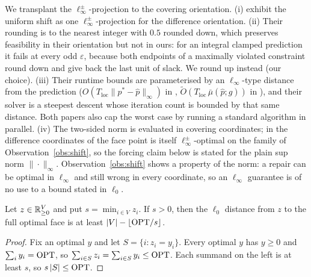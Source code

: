 We transplant the $\ell_\infty^\pm$-projection to the covering orientation.
(i) \citet[Lemma~2]{sakaue2022} exhibit the uniform shift as one $\ell_\infty^\pm$-projection for
the difference orientation. (ii) Their rounding is to the nearest integer with $0.5$ rounded down,
which preserves feasibility in their orientation but not in ours: for an integral clamped
prediction it fails at every odd $\varepsilon$, because both endpoints of a maximally violated
constraint round down and give back the last unit of slack. We round up instead (our choice). (iii) Their runtime bounds
are parameterised by an $\ell_\infty$-type distance from the prediction
($O(T_{\mathrm{loc}}\|p^*-\hat p\|_\infty)$ in \citet[Thm.~1(2)]{sakaue2022},
$\widetilde O(T_{\mathrm{loc}}\,\bar\mu(\hat p;g))$ in \citet[Thm.~1(ii)]{sakaue2023}), and their
solver is a steepest descent whose iteration count is bounded by that same distance. Both papers
also cap the worst case by running a standard algorithm in parallel. (iv) The two-sided norm is
evaluated in covering coordinates; in the difference coordinates of \citet{sakaue2022} the face
point is itself $\ell_\infty^\pm$-optimal on the family of Observation~\ref{obs:shift}, so the
forcing claim below is stated for the plain sup norm $\|\cdot\|_\infty$.
Observation~\ref{obs:shift} shows a property of the norm: a repair can be optimal
in $\ell_\infty$ and still wrong in every coordinate, so an $\ell_\infty$ guarantee is of no use
to a bound stated in $\ell_0$.

\begin{lemma}\label{lem:budget}
Let $z \in \mathbb{R}^V_{\ge 0}$ and put $s = \min_{i \in V} z_i$. If $s > 0$, then the $\ell_0$
distance from $z$ to the full optimal face is at least $|V| - \lfloor \mathrm{OPT} / s \rfloor$.
\end{lemma}
\begin{proof}
Fix an optimal $y$ and let $S = \{ i : z_i = y_i \}$. Every optimal $y$ has $y \ge 0$ and
$\sum_{i} y_i = \mathrm{OPT}$, so $\sum_{i \in S} z_i = \sum_{i \in S} y_i \le \mathrm{OPT}$. Each summand on the
left is at least $s$, so $s\,|S| \le \mathrm{OPT}$.
\end{proof}


